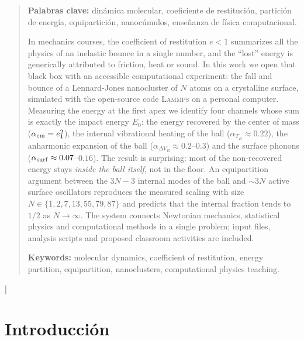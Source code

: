 \documentclass[10pt,a4paper,twocolumn]{article}
\newcommand{\lammps}{\textsc{Lammps}}
\begin{document}
{\begin{quotation}
\medskip
\noindent\textbf{Palabras clave:} dinámica molecular, coeficiente de
restitución, partición de energía, equipartición, nanocúmulos, enseñanza
de física computacional.

\bigskip
\noindent In mechanics courses, the coefficient of restitution $e<1$
summarizes all the physics of an inelastic bounce in a single number, and
the ``lost'' energy is generically attributed to friction, heat or sound.
In this work we open that black box with an accessible computational
experiment: the fall and bounce of a Lennard-Jones nanocluster of $N$
atoms on a crystalline surface, simulated with the open-source code
\lammps{} on a personal computer. Measuring the energy at the first apex
we identify four channels whose sum is exactly the impact energy $E_0$:
the energy recovered by the center of mass ($\alpha_{\rm cm}=e_1^2$), the
internal vibrational heating of the ball ($\alpha_{T_B}\approx0.22$), the
anharmonic expansion of the ball ($\alpha_{\Delta V_B}\approx0.2$--$0.3$)
and the surface phonons ($\alpha_{\rm surf}\approx0.07$--$0.16$). The
result is surprising: most of the non-recovered energy stays \emph{inside
the ball itself}, not in the floor. An equipartition argument between the
$3N-3$ internal modes of the ball and $\sim3N$ active surface oscillators
reproduces the measured scaling with size $N\in\{1,2,7,13,55,79,87\}$ and
predicts that the internal fraction tends to $1/2$ as $N\to\infty$. The
system connects Newtonian mechanics, statistical physics and computational
methods in a single problem; input files, analysis scripts and proposed
classroom activities are included.

\medskip
\noindent\textbf{Keywords:} molecular dynamics, coefficient of
restitution, energy partition, equipartition, nanoclusters, computational
physics teaching.
\end{quotation}
\vspace{14pt}
}]

\section{Introducción}
\label{sec:intro}
\end{document}
